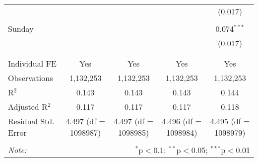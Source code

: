 \documentclass[
]{article}
\begin{document}
\begin{table}[!htbp]
{\begin{tabular}{@{\extracolsep{5pt}}lcccc}
  &  &  &  & (0.017) \\ 
  & & & & \\ 
 Sunday &  &  &  & 0.074$^{***}$ \\ 
  &  &  &  & (0.017) \\ 
  & & & & \\ 
\hline \\[-1.8ex] 
Individual FE & Yes & Yes & Yes & Yes \\ 
Observations & 1,132,253 & 1,132,253 & 1,132,253 & 1,132,253 \\ 
R$^{2}$ & 0.143 & 0.143 & 0.143 & 0.144 \\ 
Adjusted R$^{2}$ & 0.117 & 0.117 & 0.117 & 0.118 \\ 
Residual Std. Error & 4.497 (df = 1098987) & 4.497 (df = 1098985) & 4.496 (df = 1098984) & 4.495 (df = 1098979) \\ 
\hline 
\hline \\[-1.8ex] 
\textit{Note:}  & \multicolumn{4}{r}{$^{*}$p$<$0.1; $^{**}$p$<$0.05; $^{***}$p$<$0.01} \\ 
\end{tabular}
} 
\end{table} 
\newpage
\end{document}

